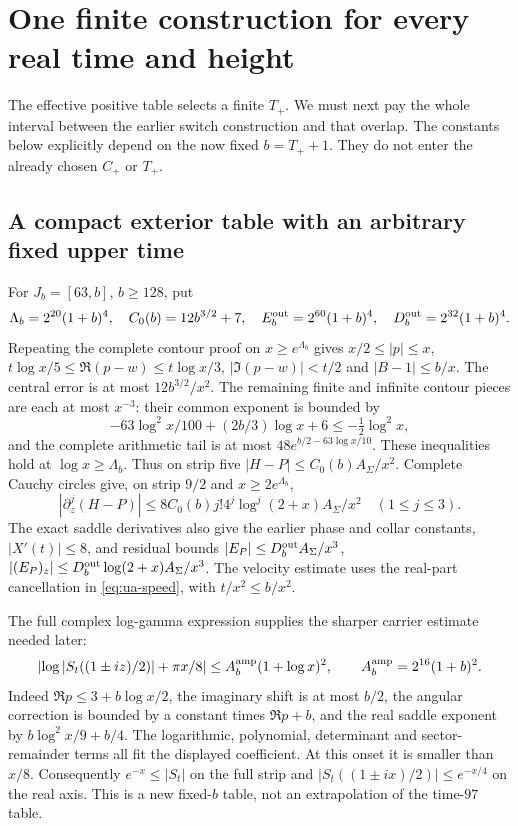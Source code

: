 \section{One finite construction for every real time and height}
\label{sec:all-time}
The effective positive table selects a finite $T_+$. We must next pay the
whole interval between the earlier switch construction and that overlap.
The constants below explicitly depend on the now fixed $b=T_++1$.
They do not enter the already chosen $C_+$ or $T_+$.

\subsection{A compact exterior table with an arbitrary fixed upper time}
For $J_b=[63,b]$, $b\ge128$, put
\[
 \Lambda_b=2^{20}(1+b)^4,\quad C_0(b)=12b^{3/2}+7,\quad
 E_b^{\rm out}=2^{60}(1+b)^4,\quad D_b^{\rm out}=2^{32}(1+b)^4.
\]
Repeating the complete contour proof on $x\ge e^{\Lambda_b}$ gives
$x/2\le|p|\le x$, $t\log x/5\le\Re(p-w)\le t\log x/3$,
$|\Im(p-w)|<t/2$ and $|B-1|\le b/x$.
The central error is at most $12b^{3/2}/x^2$. The remaining finite and
infinite contour pieces are each at most $x^{-3}$: their common exponent
is bounded by
\[
 -63\log^2x/100+(2b/3)\log x+6\le-\tfrac12\log^2x,
\]
and the complete arithmetic tail is at most
$48e^{b/2-63\log x/10}$. These inequalities hold at $\log x\ge\Lambda_b$.
Thus on strip five $|H-P|\le C_0(b)A_\Sigma/x^2$.
Complete Cauchy circles give, on strip $9/2$ and
$x\ge2e^{\Lambda_b}$,
\begin{equation}
 |\partial_z^j(H-P)|\le
 8C_0(b)j!4^j\log^j(2+x)A_\Sigma/x^2\quad(1\le j\le3).
 \label{eq:at-compact-jets}
\end{equation}
The exact saddle derivatives also give the earlier phase and collar
constants, $|X'(t)|\le8$, and residual bounds
$|E_P|\le D_b^{\rm out}A_\Sigma/x^3$,
$|(E_P)_z|\le D_b^{\rm out}\log(2+x)A_\Sigma/x^3$.
The velocity estimate uses the real-part cancellation in
\eqref{eq:ua-speed}, with $t/x^2\le b/x^2$.

The full complex log-gamma expression supplies the sharper carrier
estimate needed later:
\begin{equation}
 \left|\log|S_t((1\pm iz)/2)|+\pi x/8\right|
 \le A_b^{\rm amp}(1+\log x)^2,\qquad
 A_b^{\rm amp}=2^{16}(1+b)^2.
 \label{eq:at-carrier}
\end{equation}
Indeed $\Re p\le3+b\log x/2$, the imaginary shift is at most $b/2$,
the angular correction is bounded by a constant times $\Re p+b$,
and the real saddle exponent by $b\log^2x/9+b/4$.
The logarithmic, polynomial, determinant and sector-remainder terms all
fit the displayed coefficient. At this onset it is smaller than $x/8$.
Consequently $e^{-x}\le|S_t|$ on the full strip and
$|S_t((1\pm ix)/2)|\le e^{-x/4}$ on the real axis.
This is a new fixed-$b$ table, not an extrapolation of the time-$97$ table.

